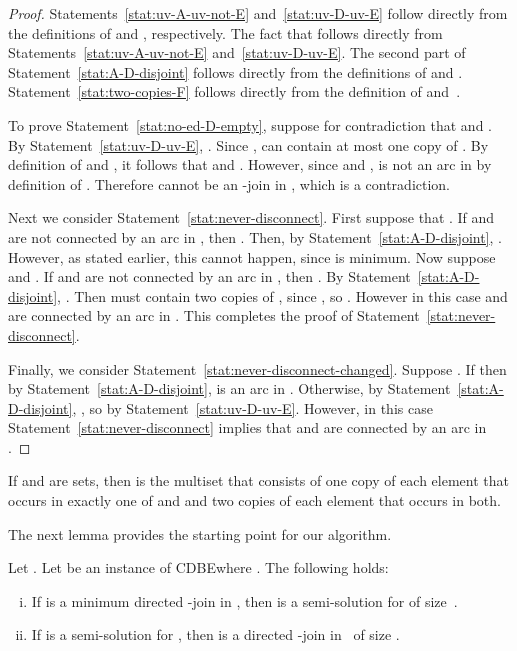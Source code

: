 \documentclass[11pt]{llncs}
\newcommand{\cdbe}{{\sc CDBE}}
\begin{document}
\begin{proof}
Statements~\ref{stat:uv-A-uv-not-E} and~\ref{stat:uv-D-uv-E} follow directly from the definitions of  and
, respectively.  The fact that  follows directly
from Statements~\ref{stat:uv-A-uv-not-E} and~\ref{stat:uv-D-uv-E}. The second part of Statement~\ref{stat:A-D-disjoint} follows
directly from the definitions of  and . Statement~\ref{stat:two-copies-F} follows
directly from the definition of  and~.

To prove Statement~\ref{stat:no-ed-D-empty}, suppose for contradiction that  and
. By Statement~\ref{stat:uv-D-uv-E}, .  
Since ,  can contain at most one copy of . By definition of  and , it follows that  and .
However, since  and ,  is not an arc in
 by definition of . Therefore  cannot be an -join in ,
which is a contradiction.

Next we consider Statement~\ref{stat:never-disconnect}. First suppose that . If
 and~ are not connected by an arc in , then . Then, by Statement~\ref{stat:A-D-disjoint}, . However, as stated
earlier, this cannot happen, since  is minimum. Now suppose  and
. If  and  are not connected by an arc in ,
then . By Statement~\ref{stat:A-D-disjoint}, . Then  must contain two copies of , since , so .
However in this case  and  are
connected by an arc in . This completes the proof of Statement~\ref{stat:never-disconnect}.

Finally, we consider Statement~\ref{stat:never-disconnect-changed}. Suppose . If 
then by Statement~\ref{stat:A-D-disjoint},  is an arc in . Otherwise, by
Statement~\ref{stat:A-D-disjoint}, , so  by Statement~\ref{stat:uv-D-uv-E}. However,
in this case Statement~\ref{stat:never-disconnect} implies that  and  are connected by an arc in
.
\end{proof}

If  and  are sets, then   is the multiset that consists of one
copy of each element that occurs in exactly one of  and  and two copies
of each element that occurs in both.

The next lemma provides the starting point for our algorithm.

\begin{lemma}\label{l-onetoone}
\begin{sloppypar}
Let  .  Let  be an
instance of \cdbe where . The following holds:
\end{sloppypar}
\begin{enumerate}[(i)]
\renewcommand{\theenumi}{(\roman{enumi})}
\renewcommand\labelenumi{\theenumi}
\item  \label{stat:f-join-is-semisolution} If  is a minimum directed -join in , then  is
a semi-solution for  of size~.
\item \label{stat:semisolution-is-f-join} If  is a semi-solution for , then 
is a directed -join in~ of size .
\end{enumerate}
\end{lemma}
\end{document}
